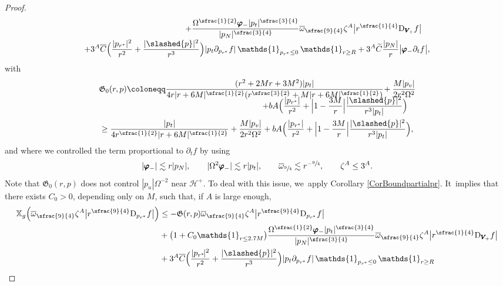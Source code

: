 \documentclass[JEP,XML,SOM,Unicode,published]{cedram}
\theoremstyle{plain}
\theoremstyle{definition}
\newcommand\z{{\zeta}}
\newcommand\T{{\mathbb{X}}}
\renewcommand\H{{\mathcal{H}^+}}
\begin{document}
\begin{proof}
\begin{multline*}
\shoveright{+ \frac{\Omega^{\sfrac{1}{2}}\pmb{\varphi}_- |p_t|^{\sfrac{3}{4}}}{|p_N|^{\sfrac{3}{4}}} \overline{\omega}_{\sfrac{9}{4}} \z^A \big| r^{\sfrac{1}{4}} \mathrm{D}_{\pmb{V}_{\! +}} f \big|}\\[-3pt]
 +3^A\overline{C} \Bigl(\frac{|p_{r^*}|^2}{r^2 }+ \frac{|\slashed{p}|^2}{r^3 } \Bigr) |p_t \partial_{p_{r^*}} f| \, \mathds{1}_{p_{r^*} \leq 0} \, \mathds{1}_{r \geq R} +3^A \widetilde{C}\frac{|p_N|}{ r} \big| \pmb{\varphi}_- \partial_t f \big|,
\end{multline*}
with\vspace*{-5pt}
\begin{multline*}
\mathfrak{G}_0(r,p) \coloneqq \frac{(r^2+2Mr+3M^2)|p_t|}{4r|r+6M|^{\sfrac{1}{2}}(r^{\sfrac{3}{2}}+M|r+6M|^{\sfrac{1}{2}}) } \! +\frac{M|p_v|}{2r^2 \Omega^2} \\[-8pt]
\shoveright{+ bA \Bigl(\frac{|p_{r^*}|}{r^2}+ \Bigl |1-\frac{3M}{r} \Bigr| \frac{|\slashed{p}|^2}{r^3|p_t|} \Bigr)}\\
\geq \frac{|p_t|}{4r^{\sfrac{1}{2}}|r+6M|^{\sfrac{1}{2}} }+\frac{M|p_v|}{2r^2 \Omega^2} + bA \Bigl(\frac{|p_{r^*}|}{r^2}+ \Bigl |1-\frac{3M}{r} \Bigr| \frac{|\slashed{p}|^2}{r^3|p_t|} \Bigr),
\end{multline*}
and where we controlled the term proportional to $\partial_t f$ by using\vspace*{-3pt}
\[
|\pmb{\varphi}_-| \lesssim r|p_N|, \qquad |\Omega^2 \pmb{\varphi}_-| \lesssim r |p_t|, \qquad \overline{\omega}_{\sfrac{9}{4}} \lesssim r^{-\sfrac{9}{4}}, \qquad \z^A \leq 3^A.
\]
Note that $\mathfrak{G}_0(r,p)$ does not control $|p_u| \Omega^{-2}$ near $\H$. To deal with this issue, we~apply Corollary \ref{CorBoundpartialpr}. It~implies that there exists $C_0 >0$, depending only on $M$, such that, if $A$ is large enough,\vspace*{-5pt}
\begin{align*}
\T_g \Bigl(\overline{\omega}_{\sfrac{9}{4}} \z^A \big| r^{\sfrac{9}{4}} \mathrm{D }_{p_{r^*}} f \big| \Bigr) &\leq - \mathfrak{G}(r,p) \overline{\omega}_{\sfrac{9}{4}} \z^A \big| r^{\sfrac{9}{4}} \mathrm{D }_{p_{r^*}} f \big| \\
& +\bigl(1+ C_0 \mathds{1}_{r \leq 2.7M} \bigr) \frac{\Omega^{\sfrac{1}{2}}\pmb{\varphi}_- |p_t|^{\sfrac{3}{4}}}{|p_N|^{\sfrac{3}{4}}} \overline{\omega}_{\sfrac{9}{4}} \z^A \big| r^{\sfrac{1}{4}} \mathrm{D}_{\pmb{V}_{\! +}} f \big| \\
&+ 3^A\overline{C} \Bigl(\frac{|p_{r^*}\!|^2}{r^2 }+ \frac{|\slashed{p}|^2}{r^3 } \Bigr) |p_t \partial_{p_{r^*}} f| \, \mathds{1}_{p_{r^*} \leq 0} \, \mathds{1}_{r \geq R} \\

\end{align*}
\end{proof}
\end{document}
